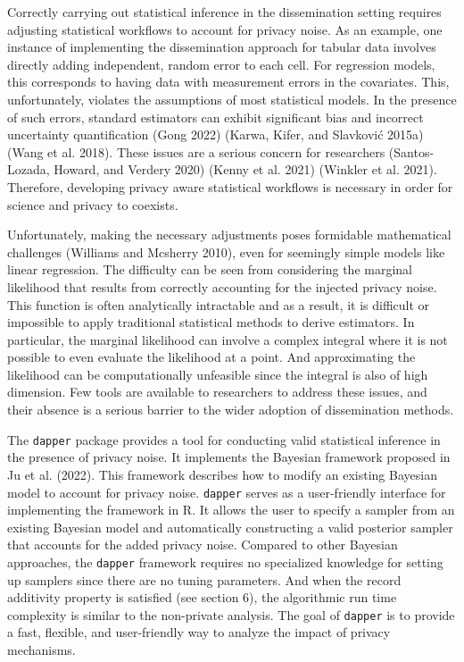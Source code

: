 Correctly carrying out statistical inference in the dissemination setting
requires adjusting statistical workflows to account for privacy noise.
As an example, one instance of implementing the dissemination approach for tabular data involves directly
adding independent, random error to each cell. For regression models,
this corresponds to having data with measurement errors
in the covariates. This, unfortunately, violates the assumptions of most statistical models.
In the presence of such errors, standard estimators can exhibit significant bias and incorrect uncertainty quantification
(Gong 2022) (Karwa, Kifer, and Slavković 2015a) (Wang et al. 2018).
These issues are a serious concern for researchers (Santos-Lozada, Howard, and Verdery 2020) (Kenny et al. 2021) (Winkler et al. 2021).
Therefore, developing privacy aware statistical workflows is necessary in order
for science and privacy to coexists.

Unfortunately, making the necessary adjustments poses formidable mathematical
challenges (Williams and Mcsherry 2010), even for seemingly simple models like linear regression.
The difficulty can be seen from considering the marginal likelihood that results from correctly accounting for the injected
privacy noise. This function is often analytically intractable and as a result,
it is difficult or impossible to apply traditional statistical methods
to derive estimators. In particular, the marginal likelihood can involve a complex
integral where it is not possible to even evaluate the likelihood
at a point. And approximating the likelihood can be computationally
unfeasible since the integral is also of high dimension.
Few tools are available to researchers to address these issues,
and their absence is a serious barrier to the wider adoption
of dissemination methods.

The \texttt{dapper} package provides a tool for conducting
valid statistical inference in the presence of privacy noise.
It implements the Bayesian framework proposed in Ju et al. (2022). This framework describes how to modify
an existing Bayesian model to account for privacy noise. \texttt{dapper}
serves as a user-friendly interface for implementing the framework in R. It allows the
user to specify a sampler from an existing Bayesian model and
automatically constructing a valid posterior sampler that accounts for the
added privacy noise. Compared to other Bayesian approaches, the \texttt{dapper} framework requires
no specialized knowledge for setting up samplers since there are no tuning parameters.
And when the record additivity property is satisfied (see section 6), the algorithmic run time
complexity is similar to the non-private analysis. The goal of \texttt{dapper} is to provide
a fast, flexible, and user-friendly way to analyze the impact of privacy mechanisms.

